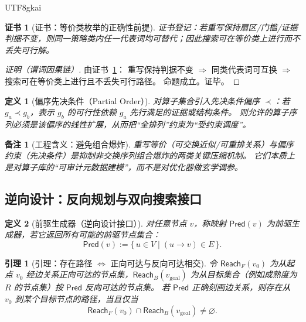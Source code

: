 \documentclass[12pt]{article}
\newtheorem{definition}{定义}[section]
\newtheorem{lemma}{引理}[section]
\newtheorem{remark}{备注}[section]
\newtheorem{Certificate}{证书}[section]
\begin{document}
\begin{CJK*}{UTF8}{gkai}
\begin{Certificate}[证书：等价类枚举的正确性前提]
\label{cert:rewriting-reduces-search-space}
证书登记：若重写保持扇区/门槛/证据判据不变，则同一策略类内任一代表词均可替代；因此搜索可在等价类上进行而不丢失可行解。
\end{Certificate}

\begin{proof}[证明（谓词因果链）]
由证书~\ref{cert:rewriting-reduces-search-space}：
重写保持判据不变 $\Rightarrow$ 同类代表词可互换 $\Rightarrow$ 搜索可在等价类上进行且不丢失可行路径。
命题成立。证毕。
\end{proof}

\begin{definition}[偏序先决条件（Partial Order）]
对算子集合引入先决条件偏序 $\prec$：若 $g_a\prec g_b$，表示 $g_b$ 的可行性依赖 $g_a$ 先行满足的证据或结构条件。
则允许的算子序列必须是该偏序的线性扩展，从而把“全排列”约束为“受约束调度”。
\end{definition}

\begin{remark}[工程含义：避免组合爆炸]
重写等价（可交换近似/可重排关系）与偏序约束（先决条件）是抑制非交换序列组合爆炸的两类关键压缩机制。
它们本质上是对算子库的“可审计元数据建模”，而不是对优化器做玄学调参。
\end{remark}

\subsection{逆向设计：反向规划与双向搜索接口}
\label{sec:lifecycle-backward-planning}

\begin{definition}[前驱生成器（逆向设计接口）]
对任意节点 $v$，称映射 $\mathsf{Pred}(v)$ 为前驱生成器，若它返回所有可能的前驱节点集合：
\[
  \mathsf{Pred}(v) := \{\,u\in V\mid (u\to v)\in E\,\}.
\]
\end{definition}

\begin{lemma}[引理：存在路径 $\Leftrightarrow$ 正向可达与反向可达相交]
\label{lem:bidirectional-search-correctness}
令 $\mathsf{Reach}_F(v_0)$ 为从起点 $v_0$ 经边关系正向可达的节点集，$\mathsf{Reach}_B(v_{\mathrm{goal}})$ 为从目标集合（例如成熟度为 $R$ 的节点集）按
  $\mathsf{Pred}$ 反向可达的节点集。
若 $\mathsf{Pred}$ 正确刻画边关系，则存在从 $v_0$ 到某个目标节点的路径，当且仅当
\[
  \mathsf{Reach}_F(v_0)\cap \mathsf{Reach}_B(v_{\mathrm{goal}})\neq\varnothing.
\]
\end{lemma}


\end{CJK*}
\end{document}
